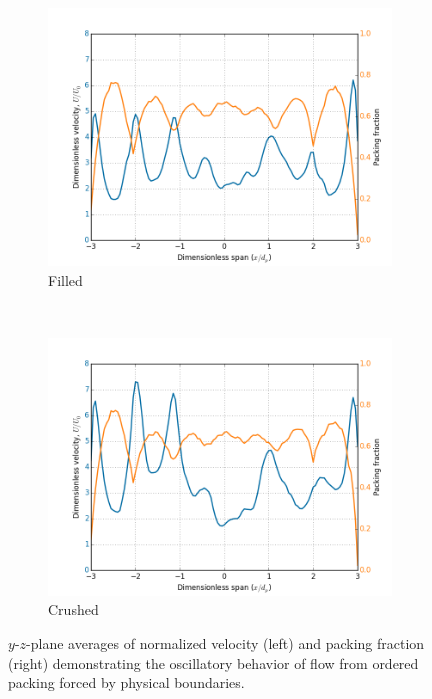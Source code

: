 \begin{figure}[!ht]
    \centering
    \begin{subfigure}[b]{0.44\textwidth}
        \includegraphics[width = \textwidth]{figures/lbm/y-phi-v-profiles-filled.png}
        \caption{Filled}\label{fig:y-phi-v-profiles-filled}
    \end{subfigure}
    ~
    \begin{subfigure}[b]{0.44\textwidth}
        \includegraphics[width = \textwidth]{figures/lbm/y-phi-v-profiles-crushed.png}
        \caption{Crushed}\label{fig:y-phi-v-profiles-crushed}
    \end{subfigure}
    \caption{$y$-$z$-plane averages of normalized velocity (left) and packing fraction (right) demonstrating the oscillatory behavior of flow from ordered packing forced by physical boundaries.}\label{fig:y-phi-v-profiles}
\end{figure}


